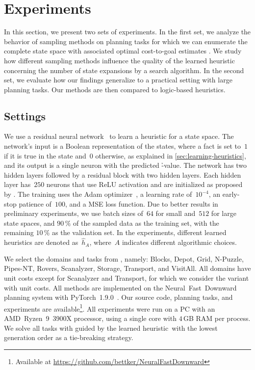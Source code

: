 \chapter{Experiments}
\label{sec:experiments}

In this section, we present two sets of experiments. In the first set, we analyze the behavior of sampling methods on planning tasks for which we can enumerate the complete state space with associated optimal cost-to-goal estimates \hstar. We study how different sampling methods influence the quality of the learned heuristic concerning the number of state expansions by a search algorithm. In the second set, we evaluate how our findings generalize to a practical setting with large planning tasks. Our methods are then compared to logic-based heuristics.

\section{Settings}
\label{sec:settings}

We use a residual neural network~\cite{he2016deep} to learn a heuristic for a state space. The network's input is a Boolean representation of the states, where a fact is set to~$1$ if it is true in the state and~$0$ otherwise, as explained in \cref{sec:learning-heuristics}, and its output is a single neuron with the predicted \h-value. The network has two hidden layers followed by a residual block with two hidden layers. Each hidden layer has~$250$ neurons that use ReLU activation and are initialized as proposed by \citet{he2015delving}. The training uses the Adam optimizer~\cite{kingma2015adam}, a learning rate of~$10^{-4}$, an early-stop patience of~$100$, and a MSE loss function. Due to better results in preliminary experiments, we use batch sizes of~$64$ for small and~$512$ for large state spaces, and $90\,\%$ of the sampled data as the training set, with the remaining $10\,\%$ as the validation set. In the experiments, different learned heuristics are denoted as~$\hat h_A$, where~$A$ indicates different algorithmic choices.

We select the domains and tasks from \citet{ferber2022neural}, namely: Blocks, Depot, Grid, N-Puzzle, Pipes-NT, Rovers, Scanalyzer, Storage, Transport, and VisitAll. All domains have unit costs except for Scanalyzer and Transport, for which we consider the variant with unit costs. All methods are implemented on the Neural~Fast~Downward planning system with PyTorch~1.9.0~\cite{ferber2020neural,paszke2019pytorch}. Our source code, planning tasks, and experiments are available\footnote{Available at \url{https://github.com/bettker/NeuralFastDownward}}. All experiments were run on a PC with an AMD~Ryzen~9~3900X processor, using a single core with $4$\,GB RAM per process. We solve all tasks with \gbfs guided by the learned heuristic~\hnn with the lowest generation order as a tie-breaking strategy.

